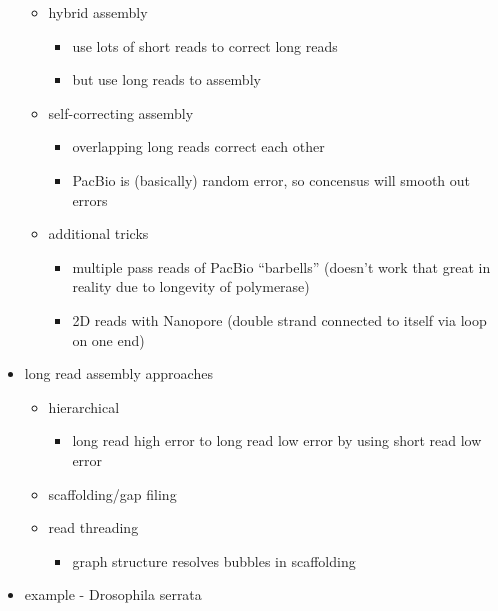 \documentclass{article}
\begin{document}
\begin{itemize}
        \begin{itemize}
            \item hybrid assembly
            \begin{itemize}
                \item use lots of short reads to correct long reads
                \item but use long reads to assembly
            \end{itemize}
            \item self-correcting assembly
            \begin{itemize}
                \item overlapping long reads correct each other
                \item PacBio is (basically) random error, so concensus will smooth out errors
            \end{itemize}
            \item additional tricks
            \begin{itemize}
                \item multiple pass reads of PacBio ``barbells'' (doesn't work that great in reality due to longevity of polymerase)
                \item 2D reads with Nanopore (double strand connected to itself via loop on one end)
            \end{itemize}
        \end{itemize}
        \item long read assembly approaches
        \begin{itemize}
            \item hierarchical
            \begin{itemize}
                \item long read high error to long read low error by using short read low error
            \end{itemize}
            \item scaffolding/gap filing
            \item read threading
            \begin{itemize}
                \item graph structure resolves bubbles in scaffolding
            \end{itemize}
        \end{itemize}
        \item example - Drosophila serrata
        \begin{itemize}

\end{itemize}
\end{itemize}
\end{document}
